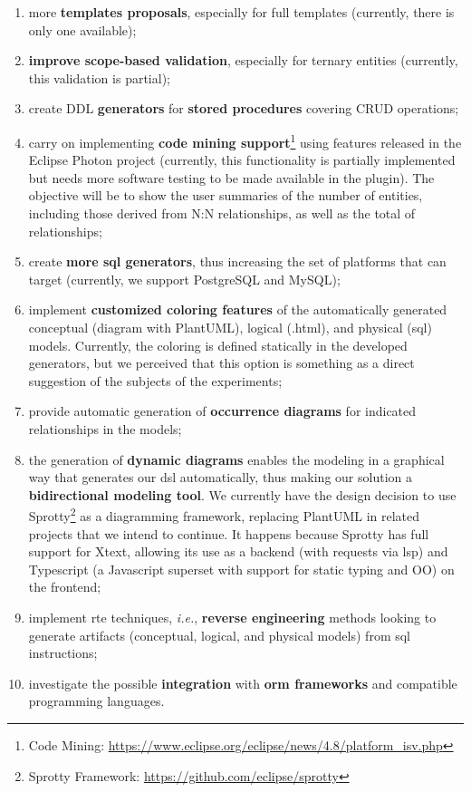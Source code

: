 \begin{enumerate} [label=\roman*.]
    \item more \textbf{templates proposals}, especially for full templates (currently, there is only one available);
    \item \textbf{improve scope-based validation}, especially for ternary entities (currently, this validation is partial);
    \item create DDL \textbf{generators} for \textbf{stored procedures} covering CRUD operations;
    \item carry on implementing  \textbf{code mining support}\footnote {Code Mining: \url{https://www.eclipse.org/eclipse/news/4.8/platform_isv.php}} using features released in the Eclipse Photon project (currently, this functionality is partially implemented but needs more software testing to be made available in the plugin).
    The objective will be to show the user summaries of the number of entities, including those derived from N:N relationships, as well as the total of relationships;
    \item create \textbf{more \ac{sql} generators}, thus increasing the set of platforms that can target (currently, we support PostgreSQL and MySQL);
    \item implement \textbf{customized coloring features} of the automatically generated conceptual (diagram with PlantUML), logical (.html), and physical (\ac{sql}) models. 
    Currently, the coloring is defined statically in the developed generators, but we perceived that this option is something as a direct suggestion of the subjects of the experiments;
    \item provide automatic generation of \textbf{occurrence diagrams} for indicated relationships in the models;
    \item the generation of \textbf{dynamic diagrams} enables the modeling in a graphical way that generates our \ac{dsl} automatically, thus making our solution a \textbf{bidirectional modeling tool}. We currently have the design decision to use Sprotty\footnote{Sprotty Framework: \url{https://github.com/eclipse/sprotty}} as a diagramming framework, replacing PlantUML in related projects that we intend to continue. It happens because Sprotty has full support for Xtext, allowing its use as a backend (with requests via \ac{lsp}) and Typescript (a Javascript superset with support for static typing and OO) on the frontend;
    \item implement \ac{rte} techniques, \textit{i.e.}, \textbf{reverse engineering} methods looking to generate artifacts (conceptual, logical, and physical models) from \ac{sql} instructions;
     \item investigate the possible \textbf{integration} with \textbf{\ac{orm} frameworks} and compatible programming languages.
\end{enumerate}



